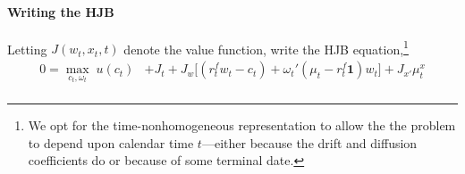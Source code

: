 \documentclass[12pt]{article}
\theoremstyle{plain}
\theoremstyle{definition}
\theoremstyle{remark}
\newcommand{\trace}{\operatorname{tr}}
\begin{document}
\paragraph{Writing the HJB}
Letting $J(w_t,x_t,t)$ denote the value function,
write the HJB equation,\footnote{%
  We opt for the time-nonhomogeneous representation to allow the the
  problem to depend upon calendar time $t$---either because the drift
  and diffusion coefficients do or because of some terminal date.
}
\begin{align*}
  0
  =
  \max_{c_t,\omega_t}
  \;
  u(c_t)
  &+
  J_t
  +
  J_{w}
  \big[
    (r^f_tw_t -c_t)
    +
    \omega_t'
    (\mu_t - r^f_t\mathbf{1})w_t
  \big]
  +
  J_{x'}
  \mu_t^x
  \\

\end{align*}
\end{document}
